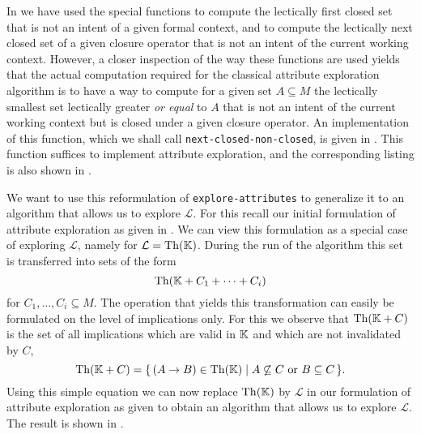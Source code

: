In  we have used the special functions to compute the
lectically first closed set that is not an intent of a given formal context, and to
compute the lectically next closed set of a given closure operator that is not an intent
of the current working context.  However, a closer inspection of the way these functions
are used yields that the actual computation required for the classical attribute
exploration algorithm is to have a way to compute for a given set $A \subseteq M$ the
lectically smallest set lectically greater \emph{or equal} to $A$ that is not an intent of
the current working context but is closed under a given closure operator.  An
implementation of this function, which we shall call \lstinline{next-closed-non-closed},
is given in .  This function
suffices to implement attribute exploration, and the corresponding listing is also shown
in .

We want to use this reformulation of \lstinline{explore-attributes} to generalize it to an
algorithm that allows us to explore $\mathcal{L}$.  For this recall our initial
formulation of attribute exploration as given in .  We can view
this formulation as a special case of exploring $\mathcal{L}$, namely for $\mathcal{L} =
\operatorname{Th}({\mathbb{K}})$.  During the run of the algorithm this set is transferred into sets of the
form
\begin{equation*}
  \operatorname{Th}({\mathbb{K}} + C_1 + \dots + C_i)
\end{equation*}
for $C_1, \dots, C_i \subseteq M$.  The operation that yields this transformation can
easily be formulated on the level of implications only.  For this we observe that
$\operatorname{Th}({\mathbb{K}} + C)$ is the set of all implications which are valid in ${\mathbb{K}}$ and which are
not invalidated by $C$, \ie
\begin{equation}
  \label{eq:35}
  \operatorname{Th}({\mathbb{K}} + C) = {\{\, (A \to B) \in \operatorname{Th}({\mathbb{K}}) \mid A \not\subseteq C \text{ or } B
    \subseteq C \,\}}.
\end{equation}
Using this simple equation we can now replace $\operatorname{Th}({\mathbb{K}})$ by $\mathcal{L}$ in our
formulation of attribute exploration as given
 to obtain an algorithm that
allows us to explore $\mathcal{L}$.  The result is shown in
.

